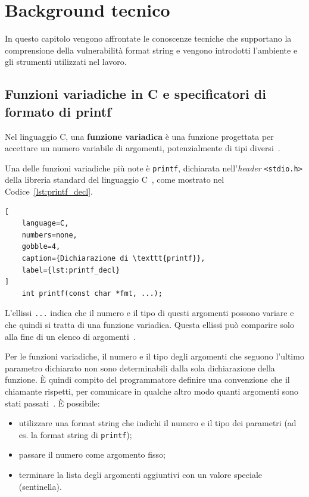 \chapter{Background tecnico}\label{chapter:background}
In questo capitolo vengono affrontate le conoscenze tecniche che supportano la comprensione della vulnerabilità format string e vengono introdotti l'ambiente e gli strumenti utilizzati nel lavoro.


\section{Funzioni variadiche in C e specificatori di formato di printf}\label{sec:funcvar_format}
\begin{defn}\label{def:funzione_variadica}
Nel linguaggio C, una \textbf{funzione variadica} è una funzione progettata per accettare un numero variabile di argomenti, potenzialmente di tipi diversi~\cite{kr1988}.
\end{defn}

Una delle funzioni variadiche più note è \texttt{printf}, dichiarata nell'\emph{header} \texttt{<stdio.h>} della libreria standard del linguaggio C~\cite{man3printf}, come mostrato nel Codice~\ref{lst:printf_decl}.
\begin{lstlisting}[
    language=C,
    numbers=none,
    gobble=4,
    caption={Dichiarazione di \texttt{printf}},
    label={lst:printf_decl}
]
    int printf(const char *fmt, ...);
\end{lstlisting}
L'ellissi \texttt{...} indica che il numero e il tipo di questi argomenti possono variare e che quindi si tratta di una funzione variadica. Questa ellissi può comparire solo alla fine di un elenco di argomenti~\cite{kr1988}.

Per le funzioni variadiche, il numero e il tipo degli argomenti che seguono l'ultimo parametro dichiarato non sono determinabili dalla sola dichiarazione della funzione. È quindi compito del programmatore definire una convenzione che il chiamante rispetti, per comunicare in qualche altro modo quanti argomenti sono stati passati~\cite{kr1988}. È possibile:
\begin{itemize}
    \item utilizzare una format string che indichi il numero e il tipo dei parametri (ad es. la format string di \texttt{printf});
    \item passare il numero come argomento fisso;
    \item terminare la lista degli argomenti aggiuntivi con un valore speciale (sentinella).
\end{itemize}

